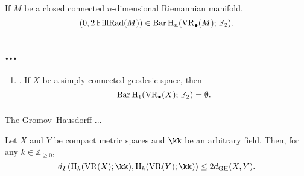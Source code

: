 \begin{proposition}\label{prop:manifold}
	If $M$ be a closed connected $n$-dimensional Riemannian manifold,
	\[
	(0,2\operatorname{FillRad}(M)) \in \operatorname{Bar} \operatorname{H}_{n}(\operatorname{VR}_\bullet(M);\,{\mathbb{F}_2}).
	\]
\end{proposition}

\subsection{...}

\begin{enumerate}

	\item\label{prop:pH1} {\rm \cite[Prop.~7.10]{virk20201}}.
	If $X$ be a simply-connected geodesic space, then
	\[
	\operatorname{Bar} \operatorname{H}_{1}(\operatorname{VR}_\bullet(X);\,{\mathbb{F}_2}) = \emptyset.
	\]
\end{enumerate}

\subsubsection{} The Gromov--Hausdorff ...

\begin{theorem}
	Let $X$ and $Y$ be compact metric spaces and $\kk$ be an arbitrary field. Then, for any $k \in \mathbb{Z}_{\geq 0}$,
	\[
	d_I \left(\rH_k(\VR(X); \kk), \rH_k(\VR(Y); \kk)\right) \leq 2 d_{\mathrm{GH}}(X, Y).
	\]
\end{theorem}